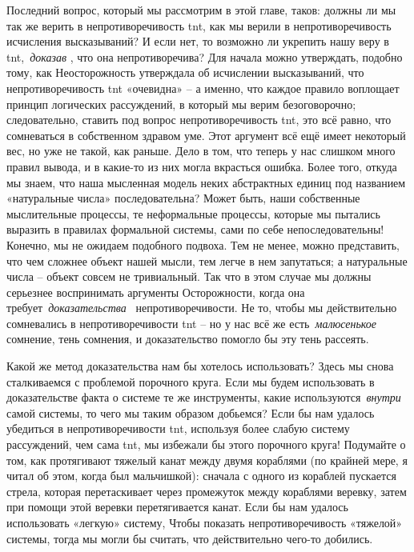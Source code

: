 \documentclass[../main.tex]{subfiles}
\begin{document}
Последний вопрос, который мы рассмотрим в этой главе, таков: должны ли мы так же верить в непротиворечивость \acs{tnt}, как мы верили в непротиворечивость исчисления высказываний? И если нет, то возможно ли укрепить нашу веру в \acs{tnt},~\emph{доказав} , что она непротиворечива? Для начала можно утверждать, подобно тому, как Неосторожность утверждала об исчислении высказываний, что непротиворечивость \acs{tnt} «очевидна» \--- а именно, что каждое правило воплощает принцип логических рассуждений, в который мы верим безоговорочно; следовательно, ставить под вопрос непротиворечивость \acs{tnt}, это всё равно, что сомневаться в собственном здравом уме. Этот аргумент всё ещё имеет некоторый вес, но уже не такой, как раньше. Дело в том, что теперь у нас слишком много правил вывода, и в какие-то из них могла вкрасться ошибка. Более того, откуда мы знаем, что наша мысленная модель неких абстрактных единиц под названием «натуральные числа» последовательна? Может быть, наши собственные мыслительные процессы, те неформальные процессы, которые мы пытались выразить в правилах формальной системы, сами по себе непоследовательны! Конечно, мы не ожидаем подобного подвоха. Тем не менее, можно представить, что чем сложнее объект нашей мысли, тем легче в нем запутаться; а натуральные числа \--- объект совсем не тривиальный. Так что в этом случае мы должны серьезнее воспринимать аргументы Осторожности, когда она требует~\emph{доказательства~} непротиворечивости. Не то, чтобы мы действительно сомневались в непротиворечивости \acs{tnt} \--- но у нас всё же есть~\emph{малюсенькое~} сомнение, тень сомнения, и доказательство помогло бы эту тень рассеять.

Какой же метод доказательства нам бы хотелось использовать? Здесь мы снова сталкиваемся с проблемой порочного круга. Если мы будем использовать в доказательстве факта о системе те же инструменты, какие используются~\emph{внутри~} самой системы, то чего мы таким образом добьемся? Если бы нам удалось убедиться в непротиворечивости \acs{tnt}, используя более слабую систему рассуждений, чем сама \acs{tnt}, мы избежали бы этого порочного круга! Подумайте о том, как протягивают тяжелый канат между двумя кораблями (по крайней мере, я читал об этом, когда был мальчишкой): сначала с одного из кораблей пускается стрела, которая перетаскивает через промежуток между кораблями веревку, затем при помощи этой веревки перетягивается канат. Если бы нам удалось использовать «легкую» систему, Чтобы показать непротиворечивость «тяжелой» системы, тогда мы могли бы считать, что действительно чего-то добились.
\end{document}
